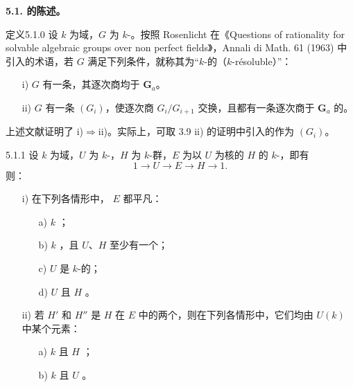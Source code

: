 \textbf{5.1. 的陈述。}
\begin{SGAresult}{定义}{5.1.0}
设 $k$ 为域，$G$ 为 $k$-。按照 Rosenlicht 在《Questions of rationality for solvable algebraic groups over non perfect fields》，Annali di Math. 61 (1963) 中引入的术语，若 $G$ 满足下列条件，就称其为“$k$-的（$k$-résoluble）”：
\begin{enumerate}
\item[i)] $G$ 有一条，其逐次商均于 $\mathbf G_a$。
\item[ii)] $G$ 有一条 $(G_i)$，使逐次商 $G_i/G_{i+1}$ 交换，且都有一条逐次商于 $\mathbf G_a$ 的。
\end{enumerate}
\end{SGAresult}
上述文献证明了 i)$\Rightarrow$ii)。实际上，可取 3.9 ii) 的证明中引入的作为 $(G_i)$。
\begin{SGAresult}{}{5.1.1}
设 $k$ 为域，$U$ 为 $k$-，$H$ 为 $k$-群，$E$ 为以 $U$ 为核的 $H$ 的 $k$-，即有
\[1\longrightarrow U\longrightarrow E\longrightarrow H\longrightarrow1.\]
则：
\begin{enumerate}
\item[i)] 在下列各情形中， $E$ 都平凡：
\begin{enumerate}
\item[a)] $k$ ；
\item[b)] $k$ ，且 $U$、$H$ 至少有一个；
\item[c)] $U$ 是 $k$-的；
\item[d)] $U$ 且 $H$ 。
\end{enumerate}
\item[ii)] 若 $H'$ 和 $H''$ 是 $H$ 在 $E$ 中的两个，则在下列各情形中，它们均由 $U(k)$ 中某个元素：
\begin{enumerate}
\item[a)] $k$ 且 $H$ ；
\item[b)] $k$ 且 $U$ 。
\end{enumerate}
\end{enumerate}
\end{SGAresult}
